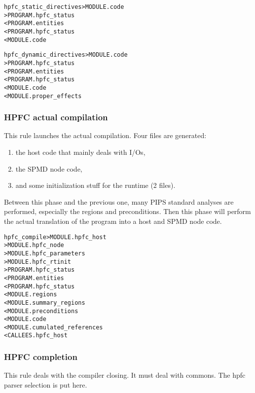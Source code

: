 \documentclass[a4paper]{report}
\newenvironment{PipsMake}{\begin{alltt}}{\end{alltt}}
\newenvironment{PipsPass}[1]{\label{pass:#1}}{}
\begin{document}
\begin{PipsMake}
hpfc_static_directives         > MODULE.code
                        > PROGRAM.hpfc_status
    < PROGRAM.entities
    < PROGRAM.hpfc_status
    < MODULE.code

hpfc_dynamic_directives         > MODULE.code
                        > PROGRAM.hpfc_status
    < PROGRAM.entities
    < PROGRAM.hpfc_status
    < MODULE.code
    < MODULE.proper_effects
\end{PipsMake}

\subsubsection{HPFC actual compilation}

This rule launches the actual compilation. Four files are generated:

\begin{enumerate}
\item  the host code that mainly deals with I/Os,
\item the SPMD node code,
\item and some initialization stuff for the runtime (2 files).
\end{enumerate}

Between this phase and the previous
one, many PIPS standard analyses are performed, especially the regions and
preconditions.  Then this phase will perform the actual translation of the
program into a host and SPMD node code.

\begin{PipsMake}
hpfc_compile           > MODULE.hpfc_host
                       > MODULE.hpfc_node
                       > MODULE.hpfc_parameters
                       > MODULE.hpfc_rtinit
                       > PROGRAM.hpfc_status
    < PROGRAM.entities
    < PROGRAM.hpfc_status
    < MODULE.regions
    < MODULE.summary_regions
    < MODULE.preconditions
    < MODULE.code
    < MODULE.cumulated_references
    < CALLEES.hpfc_host
\end{PipsMake}

\subsubsection{HPFC completion}

\begin{PipsPass}{hpfc_close}
This rule deals with the compiler closing. It must deal with commons.
The hpfc parser selection is put here.
\end{PipsPass}
\end{document}
